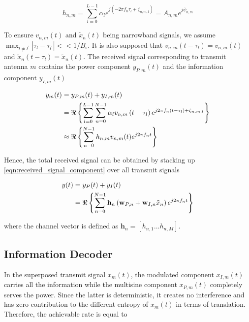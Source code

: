 \begin{equation}\label{eqn:channel}
  {h_{n,m}} = \sum\limits_{l = 0}^{L - 1} {{\alpha _l}{e^{j\left( { - 2\pi {f_n}{\tau _l} + {\zeta _{n,m,l}}} \right)}}}  = {A_{n,m}}{e^{j{{\bar \psi }_{n,m}}}}
\end{equation}

To ensure $v_{n, m}(t)$ and $\tilde{x}_{n}(t)$ being narrowband signals, we assume ${\max _{l \ne {l^\prime }}}\left| {{\tau _l} - {\tau _{{l^\prime }}}} \right| <  < 1/{B_{\text{s}}}$. It is also supposed that ${v_{n,m}}\left( {t - {\tau _l}} \right) = {v_{n,m}}(t)$ and ${{\tilde x}_n}\left( {t - {\tau _l}} \right) = {{\tilde x}_n}(t)$. The received signal corresponding to transmit antenna $m$ contains the power component $y_{P, m}(t)$ and the information component $y_{I, m}(t)$

\begin{align}\label{eqn:received_signal_component}
  {y_m}(t) &= {y_{P,m}}(t) + {y_{I,m}}(t) \hfill \\
   &= \Re \left\{ {\sum\limits_{l = 0}^{L - 1} {\sum\limits_{n = 0}^{N - 1} {{\alpha _l}} } {v_{n,m}}\left( {t - {\tau _l}} \right){e^{j2\pi {f_n}\left( {t - {\tau _l}} \right) + {\zeta _{n,m,l}}}}} \right\} \hfill \\
   &\approx \Re \left\{ {\sum\limits_{n = 0}^{N - 1} {{h_{n,m}}} {v_{n,m}}(t){e^{j2\pi {f_n}t}}} \right\} \hfill
\end{align}

Hence, the total received signal can be obtained by stacking up \eqref{eqn:received_signal_component} over all transmit signals

\begin{align}\label{eqn:received_signal}
  y(t) &= {y_P}(t) + {y_I}(t) \hfill \\
   &= \Re \left\{ {\sum\limits_{n = 0}^{N - 1} {{{\mathbf{h}}_n}} \left( {{{\mathbf{w}}_{P,n}} + {{\mathbf{w}}_{I,n}}{{\tilde x}_n}} \right){e^{j2\pi {f_n}t}}} \right\} \hfill
\end{align}

where the channel vector is defined as ${{\mathbf{h}}_n} = \left[ {{h_{n,1}} \ldots {h_{n,M}}} \right]$.



\subsection{Information Decoder}\label{sec:information-decoder}
In the superposed transmit signal ${x_m}(t)$, the modulated component ${x_{I,m}}(t)$ carries all the information while the multisine component ${x_{P,m}}(t)$ completely serves the power. Since the latter is deterministic, it creates no interference and has zero contribution to the different entropy of ${x_m}(t)$ in terms of translation. Therefore, the achievable rate is equal to


